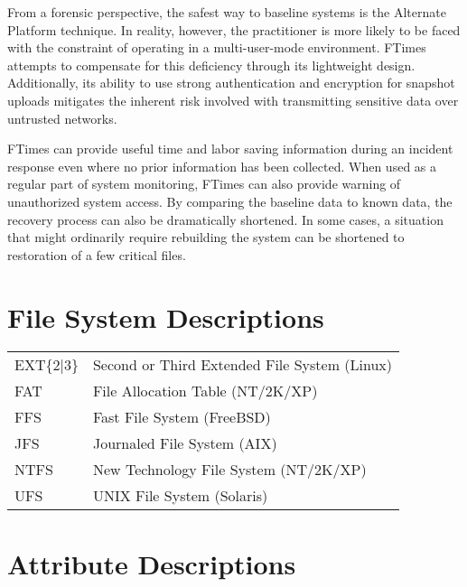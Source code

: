 \documentclass[10pt]{article}
\begin{document}
From a forensic perspective, the safest way to baseline systems is the
Alternate Platform technique.  In reality, however, the practitioner
is more likely to be faced with the constraint of operating in a
multi-user-mode environment.  FTimes attempts to compensate for this
deficiency through its lightweight design.  Additionally, its ability
to use strong authentication and encryption for snapshot uploads
mitigates the inherent risk involved with transmitting sensitive data
over untrusted networks.

FTimes can provide useful time and labor saving information during an
incident response even where no prior information has been collected.
When used as a regular part of system monitoring, FTimes can also
provide warning of unauthorized system access.  By comparing the
baseline data to known data, the recovery process can also be
dramatically shortened.  In some cases, a situation that might
ordinarily require rebuilding the system can be shortened to
restoration of a few critical files.

\newpage
\appendix
\section{File System Descriptions}

\begin{center}
\begin{supertabular}{lp{4.75in}}
EXT\{2$\mid$3\}
&
Second or Third Extended File System (Linux)
\\[.5em]
FAT
&
File Allocation Table (NT/2K/XP)
\\[.5em]
FFS
&
Fast File System (FreeBSD)
\\[.5em]
JFS
&
Journaled File System (AIX)
\\[.5em]
NTFS
&
New Technology File System (NT/2K/XP)
\\[.5em]
UFS
&
UNIX File System (Solaris)
\\[.5em]
\end{supertabular}
\end{center}

\section{Attribute Descriptions}
\end{document}
